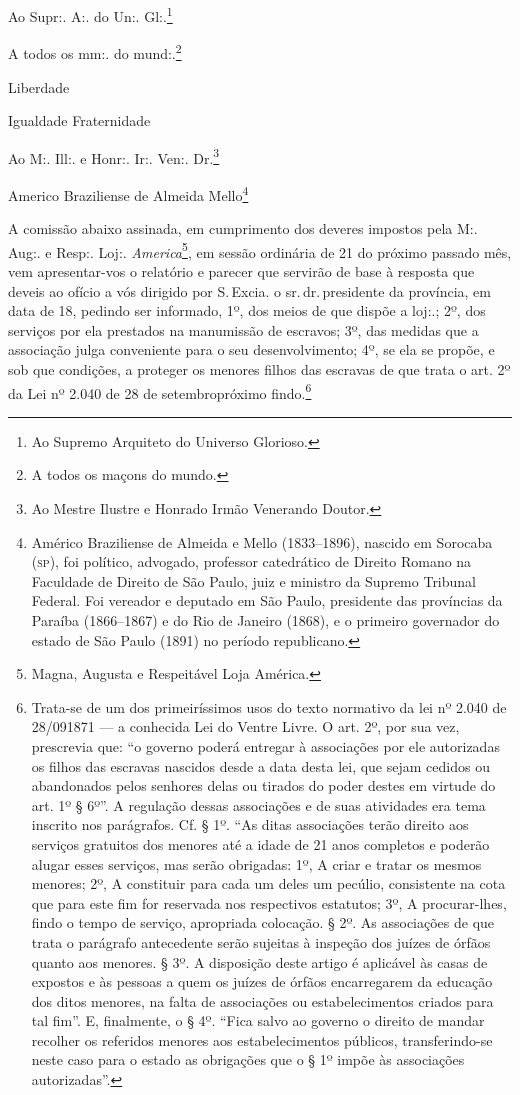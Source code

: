 Ao Supr:. A:. do Un:. Gl:.\footnote{ Ao Supremo Arquiteto do Universo
  Glorioso.}

A todos os mm:. do mund:.\footnote{ A todos os maçons do mundo.}

Liberdade

Igualdade Fraternidade

Ao M:. Ill:. e Honr:. Ir:. Ven:. Dr.\footnote{ Ao Mestre Ilustre e
  Honrado Irmão Venerando Doutor.}

Americo Braziliense de Almeida Mello\footnote{ Américo Braziliense de
  Almeida e Mello (1833--1896), nascido em Sorocaba (\textsc{sp}), foi político,
  advogado, professor catedrático de Direito Romano na Faculdade de
  Direito de São Paulo, juiz e ministro da Supremo Tribunal Federal. Foi
  vereador e deputado em São Paulo, presidente das províncias da Paraíba
  (1866--1867) e do Rio de Janeiro (1868), e o primeiro governador do
  estado de São Paulo (1891) no período republicano.}

A comissão abaixo assinada, em cumprimento dos deveres impostos pela M:.
Aug:. e Resp:. Loj:. \emph{America}\footnote{ Magna, Augusta e
  Respeitável Loja América.}, em sessão ordinária de 21 do próximo
passado mês, vem apresentar-vos o relatório e parecer que servirão de
base à resposta que deveis ao ofício a vós dirigido por S.\,Excia. o sr.\,dr.\,presidente da província, em data de 18, pedindo ser informado, 1º,
dos meios de que dispõe a loj:.; 2º, dos serviços por ela prestados na
manumissão de escravos; 3º, das medidas que a associação julga
conveniente para o seu desenvolvimento; 4º, se ela se propõe, e sob que
condições, a proteger os menores filhos das escravas de que trata o art.
2º da Lei nº 2.040 de 28 de setembropróximo findo.\footnote{ Trata-se
  de um dos primeiríssimos usos do texto normativo da lei nº 2.040 de
  28/091871 --- a conhecida Lei do Ventre Livre. O art. 2º, por sua vez,
  prescrevia que: ``o governo poderá entregar à associações por ele
  autorizadas os filhos das escravas nascidos desde a data desta lei,
  que sejam cedidos ou abandonados pelos senhores delas ou tirados do
  poder destes em virtude do art. 1º § 6º''. A regulação dessas
  associações e de suas atividades era tema inscrito nos parágrafos. Cf.
  § 1º. ``As ditas associações terão direito aos serviços gratuitos dos
  menores até a idade de 21 anos completos e poderão alugar esses
  serviços, mas serão obrigadas: 1º, A criar e tratar os mesmos menores;
  2º, A constituir para cada um deles um pecúlio, consistente na cota
  que para este fim for reservada nos respectivos estatutos; 3º, A
  procurar-lhes, findo o tempo de serviço, apropriada colocação. § 2º.
  As associações de que trata o parágrafo antecedente serão sujeitas à
  inspeção dos juízes de órfãos quanto aos menores. § 3º. A disposição
  deste artigo é aplicável às casas de expostos e às pessoas a quem os
  juízes de órfãos encarregarem da educação dos ditos menores, na falta
  de associações ou estabelecimentos criados para tal fim''. E,
  finalmente, o § 4º. ``Fica salvo ao governo o direito de mandar
  recolher os referidos menores aos estabelecimentos públicos,
  transferindo-se neste caso para o estado as obrigações que o § 1º
  impõe às associações autorizadas''.}

